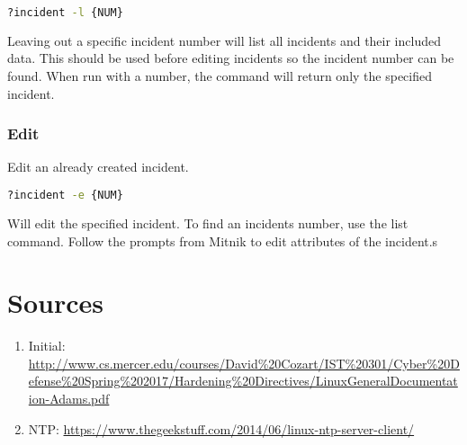 \documentclass{article}
\begin{document}
\begin{lstlisting}[language=bash]
?incident -l {NUM}
\end{lstlisting}

Leaving out a specific incident number will list all incidents and their included data. This should be used before editing incidents so the incident number can be found. When run with a number, the command will return only the specified incident.

\subsubsection{Edit}
Edit an already created incident.

\begin{lstlisting}[language=bash]
?incident -e {NUM}
\end{lstlisting}

Will edit the specified incident. To find an incidents number, use the list command. Follow the prompts from Mitnik to edit attributes of the incident.s


\section{Sources}
\begin{enumerate}
    \item Initial: \url{http://www.cs.mercer.edu/courses/David%20Cozart/IST%20301/Cyber%20Defense%20Spring%202017/Hardening%20Directives/LinuxGeneralDocumentation-Adams.pdf} 
   	\item NTP:
   	\url{https://www.thegeekstuff.com/2014/06/linux-ntp-server-client/}
\end{enumerate}
\end{document}
